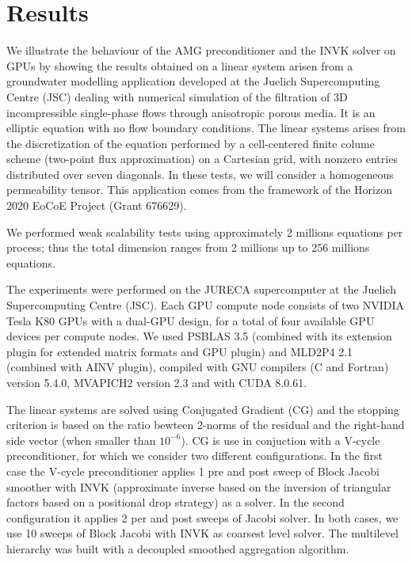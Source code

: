 \section{Results}

We illustrate the behaviour of the AMG preconditioner and the INVK
solver on GPUs  by showing the results obtained on a linear system
arisen from a groundwater modelling application developed at the
Juelich Supercomputing Centre (JSC)  dealing with numerical simulation
of the filtration of 3D incompressible single-phase flows through
anisotropic porous media. It is an elliptic equation with no flow
boundary conditions. The linear systems arises from the discretization
of the equation performed by a cell-centered finite colume scheme
(two-point flux approximation) on a Cartesian grid, with nonzero
entries distributed over seven diagonals. In these tests, we will
consider a homogeneous permeability tensor.  This application comes
from the framework of the Horizon 2020 EoCoE Project (Grant
676629). 

We performed weak scalability tests using approximately 2 millions
equations per process; thus  the total dimension ranges from 2
millions up to 256 millions equations. 

The experiments were performed on  the JURECA supercomputer at the
Juelich Supercomputing Centre (JSC).  Each GPU compute node consists
of two NVIDIA Tesla K80 GPUs with a dual-GPU design, for a total of
four available GPU devices per compute nodes.   
We used PSBLAS 3.5 (combined with its extension plugin for extended
matrix formats and GPU plugin) and MLD2P4 2.1 (combined with AINV
plugin),  compiled with  GNU compilers (C and Fortran) version 5.4.0,
MVAPICH2 version 2.3 and with CUDA 8.0.61. 

The linear systems are solved using Conjugated Gradient (CG) and the
stopping criterion is based on the ratio bewteen 2-norms of the
residual and the right-hand side vector (when smaller than
$10^{-6}$). CG is use in conjuction with a V-cycle preconditioner, for
which we consider two different configurations. In the first case the
V-cycle 
preconditioner applies 1 pre and post sweep of Block Jacobi smoother
with INVK (approximate inverse based on the inversion of triangular
factors based on a positional drop strategy) as a solver. In the
second configuration it applies 2 per and post sweeps of Jacobi
solver. In both cases, we use 10 sweeps of Block Jacobi with INVK  as
coarsest level solver.   The multilevel hierarchy was built with a
decoupled smoothed aggregation algorithm. 

